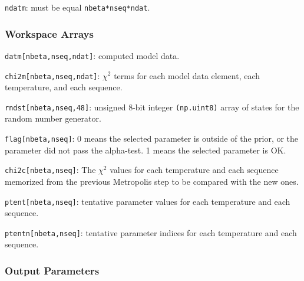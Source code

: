 \documentclass[preprint2]{aastex}
\begin{document}
\verb|ndatm|: must be equal \verb|nbeta*nseq*ndat|.



\subsubsection{Workspace Arrays}

\verb|datm[nbeta,nseq,ndat]|: computed model data.

\verb|chi2m[nbeta,nseq,ndat]|: $\chi^2$ terms for each model data element, each
                        temperature, and each sequence.

\verb|rndst[nbeta,nseq,48]|: unsigned 8-bit integer \verb|(np.uint8)| array of states
                      for the random number generator.

\verb|flag[nbeta,nseq]|: 0 means the selected parameter is outside of the prior,
                  or the parameter did not pass the alpha-test.
                  1 means the selected parameter is OK.
                  
\verb|chi2c[nbeta,nseq]|: The $\chi^2$ values for each temperature and each sequence 
                          memorized from the previous Metropolis step to be compared
                          with the new ones.

\verb|ptent[nbeta,nseq]|: tentative parameter values for each temperature and each
                   sequence.

\verb|ptentn[nbeta,nseq]|: tentative parameter indices for each temperature and each
                    sequence.




\subsubsection{Output Parameters}
\end{document}
